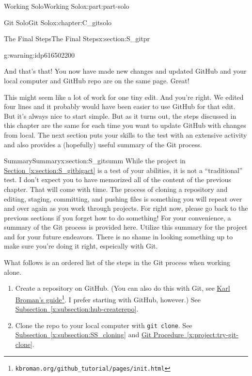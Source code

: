 \documentclass[oneside,10pt,]{book}
\newcommand{\xreffont}{\relax}
\newcommand{\mono}[1]{\texttt{#1}}
\begin{document}
\begin{partptx}{Working Solo}{}{Working Solo}{}{}{x:part:part-solo}
\begin{chapterptx}{Git Solo}{}{Git Solo}{}{}{x:chapter:C_gitsolo}
\begin{sectionptx}{The Final Steps}{}{The Final Steps}{}{}{x:section:S_gitpr}
\begin{warning}{}{g:warning:idp616502200}
\end{warning}
And that's that! You now have made new changes and updated GitHub and your local computer and GitHub repo are on the same page. Great!%
\par
This might seem like a lot of work for one tiny edit. And you're right. We edited four lines and it probably would have been easier to use GitHub for that edit. But it's always nice to start simple. But as it turns out, the steps discussed in this chapter are the same for each time you want to update GitHub with changes from local. The next section puts your skills to the test with an extensive activity and also provides a (hopefully) useful summary of the Git process.%
\end{sectionptx}
%
%
\typeout{************************************************}
\typeout{************************************************}
%
\begin{sectionptx}{Summary}{}{Summary}{}{}{x:section:S_gitsumm}
%
While the project in \hyperref[x:section:S_gitbigact]{Section~{\xreffont\ref{x:section:S_gitbigact}}} is a test of your abilities, it is not a ``traditional'' test. I don't expect you to have memorized all of the content of the previous chapter. That will come with time. The process of cloning a repository and editing, staging, committing, and pushing files is something you will repeat over and over again as you work through projects. For right now, please go back to the previous sections if you forget how to do something! For your convenience, a summary of the Git process is provided here. Utilize this summary for the project and for your future endeavors. There is no shame in looking something up to make sure you're doing it right, espeically with Git.%
\par
What follows is an ordered list of the steps in the Git process when working alone.%
\begin{enumerate}
\item{}Create a repository on GitHub. (You can also do this with Git, see \href{https://kbroman.org/github_tutorial/pages/init.html}{Karl Broman's guide}\footnote{\nolinkurl{kbroman.org/github_tutorial/pages/init.html}\label{g:fn:idp616507448}}. I prefer starting with GitHub, however.) See \hyperref[x:subsection:hub-createrepo]{Subsection~{\xreffont\ref{x:subsection:hub-createrepo}}}.%
\item{}Clone the repo to your local computer with \mono{git clone}. See \hyperref[x:subsection:SS_cloning]{Subsection~{\xreffont\ref{x:subsection:SS_cloning}}} and \hyperref[x:project:try-git-clone]{Git Procedure~{\xreffont\ref{x:project:try-git-clone}}}.%

\end{enumerate}
\end{sectionptx}
\end{chapterptx}
\end{partptx}
\end{document}
